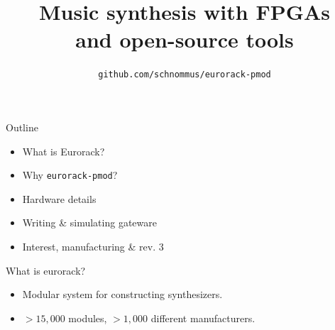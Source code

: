 \documentclass{beamer}
\title{Music synthesis with FPGAs \\and open-source tools}
\subtitle{}
\author{\texttt{github.com/schnommus/eurorack-pmod}}
\institute{Sebastian Holzapfel}
\date{}
\begin{document}
\maketitle

\setwatermark{}








\begin{frame}{Outline}


    \begin{itemize}
        \item What is Eurorack?
        \item Why \texttt{eurorack-pmod}?
        \item Hardware details
        \item Writing \& simulating gateware
        \item Interest, manufacturing \& rev. 3
    \end{itemize}

\end{frame}

\begin{frame}{What is eurorack?}

    \begin{itemize}
        \item Modular system for constructing synthesizers.
        \item $>15,000$ modules, $>1,000$ different manufacturers.
    \end{itemize}



\end{frame}
\end{document}
